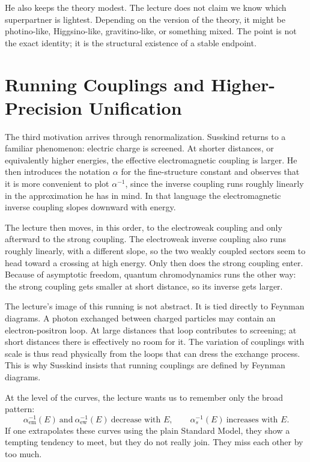 He also keeps the theory modest. The lecture does not claim we know which superpartner is lightest. Depending on the version of the theory, it might be photino-like, Higgsino-like, gravitino-like, or something mixed. The point is not the exact identity; it is the structural existence of a stable endpoint.

\section{Running Couplings and Higher-Precision Unification}

The third motivation arrives through renormalization. Susskind returns to a familiar phenomenon: electric charge is screened. At shorter distances, or equivalently higher energies, the effective electromagnetic coupling is larger. He then introduces the notation \(\alpha\) for the fine-structure constant and observes that it is more convenient to plot \(\alpha^{-1}\), since the inverse coupling runs roughly linearly in the approximation he has in mind. In that language the electromagnetic inverse coupling slopes downward with energy.

The lecture then moves, in this order, to the electroweak coupling and only afterward to the strong coupling. The electroweak inverse coupling also runs roughly linearly, with a different slope, so the two weakly coupled sectors seem to head toward a crossing at high energy. Only then does the strong coupling enter. Because of asymptotic freedom, quantum chromodynamics runs the other way: the strong coupling gets smaller at short distance, so its inverse gets larger.

The lecture's image of this running is not abstract. It is tied directly to Feynman diagrams. A photon exchanged between charged particles may contain an electron-positron loop. At large distances that loop contributes to screening; at short distances there is effectively no room for it. The variation of couplings with scale is thus read physically from the loops that can dress the exchange process. This is why Susskind insists that running couplings are defined by Feynman diagrams.

At the level of the curves, the lecture wants us to remember only the broad pattern:
\begin{equation}
\alpha_{\mathrm{em}}^{-1}(E)\ \text{and}\ \alpha_{\mathrm{ew}}^{-1}(E)\ \text{decrease with }E,
\qquad
\alpha_s^{-1}(E)\ \text{increases with }E.
\end{equation}
If one extrapolates these curves using the plain Standard Model, they show a tempting tendency to meet, but they do not really join. They miss each other by too much.

